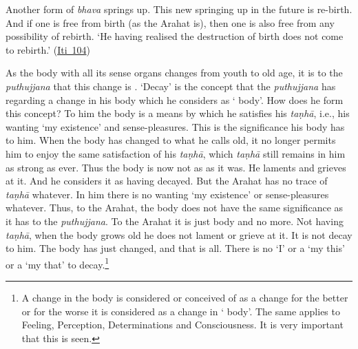 Another form of \emph{bhava} springs up. This new springing up in the future is re-birth. And if one is free from birth (as the Arahat is), then one is also free from any possibility of rebirth. `He having realised the destruction of birth does not come to rebirth.' (\href{https://suttacentral.net/iti104/en/sujato}{Iti~104})

As the body with all its sense organs changes from youth to old age, it is to the \emph{puthujjana} that this change is . `Decay' is the concept that the \emph{puthujjana} has regarding a change in his body which he considers as ` body'. How does he form this concept? To him the body is a means by which he satisfies his \emph{taṇhā}, i.e., his wanting `my existence' and sense-pleasures. This is the significance his body has to him. When the body has changed to what he calls old, it no longer permits him to enjoy the same satisfaction of his \emph{taṇhā}, which \emph{taṇhā} still remains in him as strong as ever. Thus the body is now not as  as it was. He laments and grieves at it. And he considers it as having decayed. But the Arahat has no trace of \emph{taṇhā} whatever. In him there is no wanting `my existence' or sense-pleasures whatever. Thus, to the Arahat, the body does not have the same significance as it has to the \emph{puthujjana}. To the Arahat it is just body and no more. Not having \emph{taṇhā}, when the body grows old he does not lament or grieve at it. It is not decay to him. The body has just changed, and that is all. There is no `I' or a `my this' or a `my that' to decay.\footnote{A change in the body is considered or conceived of as a change for the better or for the worse  it is considered as a change in ` body'. The same applies to Feeling, Perception, Determinations and Consciousness. It is very important that this is seen.}

